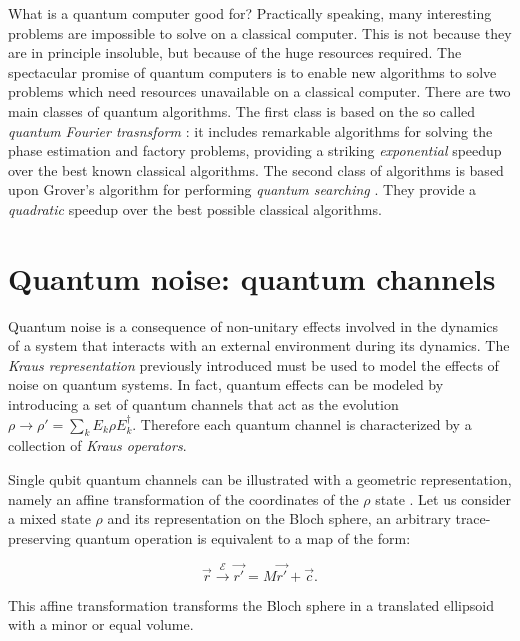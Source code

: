 What is a quantum computer good for? Practically speaking, many interesting problems are impossible to solve on a classical computer. This is not because they are in principle insoluble, but because of the huge resources required. The spectacular promise of quantum computers is to enable new algorithms to solve problems which need resources unavailable on a classical computer. 
There are two main classes of quantum algorithms. The first class is based on the so called \textit{quantum Fourier trasnsform} \cite{Nielsen}: it includes remarkable algorithms for solving the phase estimation and factory problems, providing  a striking \textit{exponential} speedup over the best known classical algorithms. The second class of algorithms is based upon Grover's algorithm for performing \textit{quantum searching} \cite{Nielsen}. They provide a \textit{quadratic} speedup over the best possible classical algorithms. 





\section{Quantum noise: quantum channels}  %
\label{QuantumChannels}

Quantum noise is a consequence of non-unitary effects involved in the dynamics of a system that interacts with an external environment during its dynamics. 
The \textit{Kraus representation} previously introduced must be used to model the effects of noise on quantum systems. In fact, quantum effects can be modeled by introducing a set of quantum channels that act as the evolution  $\rho \rightarrow \rho ' =  \sum_k E_k \rho E_k^\dagger$. Therefore each quantum channel is characterized by a collection of \textit{Kraus operators}.

Single qubit quantum channels can be illustrated with a geometric representation, namely an affine transformation of the coordinates of the $\rho$ state \cite{Nielsen}.
 Let us consider a mixed state $\rho$ and its representation on the Bloch sphere, an arbitrary trace-preserving quantum operation is equivalent to a map of the form:

\begin{equation}
\vec{r} \overset{\mathcal{E}} \rightarrow \vec{r'} = M \vec{r'} + \vec{c}.
\label{19_firstchapter}
\end{equation}

\noindent This affine transformation transforms the Bloch sphere in a translated ellipsoid with a minor or equal volume.
 
